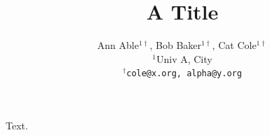 \documentclass{article}
\begin{document}
\title{A Title}
\author{Ann Able$^{1\dagger}$, Bob Baker$^{1\dagger}$, Cat Cole$^{1\dagger}$ \\
$^1$Univ A, City \\
$^\dagger$\texttt{cole@x.org, alpha@y.org}}
\maketitle
Text.
\end{document}
